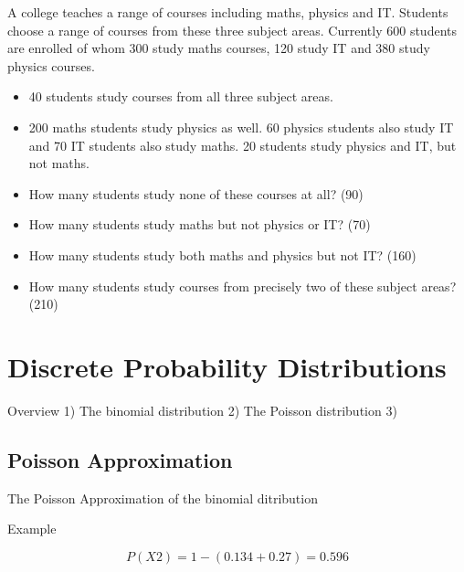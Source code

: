 \documentclass[12pt]{report}
\begin{document}


A college teaches a range of courses including maths, physics and IT.
Students choose a range of courses from these three subject areas. Currently 600
students are enrolled of whom 300 study maths courses, 120 study IT
and 380 study physics courses. 

\begin{itemize}
	\item 40 students study courses from all three subject
	areas. 
	\item 200 maths students study physics as well. 60 physics students
	also study IT and 70 IT students also study maths. 20 students study physics and IT, but not maths.
\end{itemize}



\begin{itemize}
	\item How many students study none of these courses at all? (90)
	
	\item How many students study maths but not physics or IT? (70)
	
	\item How many students study both maths and physics but not IT? (160)
	
	\item How many students study courses from precisely two of these subject
	areas? (210)
\end{itemize}


 		\chapter{Discrete Probability Distributions}
Overview
1) The binomial distribution
2) The Poisson distribution
3) 

\section{Poisson Approximation}
The Poisson Approximation of the binomial ditribution

Example

\[P(X2) = 1- (0.134+0.27) = 0.596\]
\end{document}
